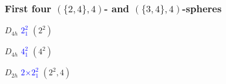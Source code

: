 \documentclass{beamer}
\begin{document}
\begin{frame}\frametitle{First four $(\{2,4\},4)$- and  $(\{3,4\},4)$-spheres}
\vspace{-4mm}
\begin{center}
\begin{minipage}[b]{24mm}
\centering
{}\par
$D_{4h}$ \textcolor{blue}{$2^2_1$} $(2^2)$
\end{minipage}
\begin{minipage}[b]{21mm}
\centering
{}\par
$D_{4h}$ \textcolor{blue}{$4^2_1$}  $(4^2)$
\end{minipage}
\begin{minipage}[b]{29mm}
\centering
{}\par
$D_{2h}$ 
\textcolor{blue}{$2$$\times$$ 2^2_1$} 
 $(2^2,4)$ 
\end{minipage}
\begin{minipage}[b]{24mm}
\centering
{}\par

\end{minipage}
\end{center}
\end{frame}
\end{document}
